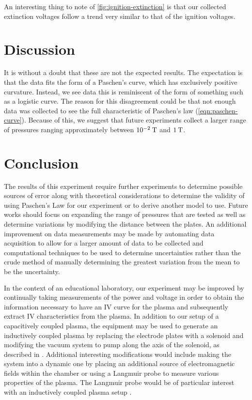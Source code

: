 \documentclass[reprint]{revtex4-1}
\begin{document}
An interesting thing to note of \cref{fig:ignition-extinction} is that our collected extinction voltages follow a trend very similar to that of the ignition voltages.

\section{Discussion}

It is without a doubt that these are not the expected results. The expectation is that the data fits the form of a Paschen's curve, which has exclusively positive curvature. Instead, we see data this is reminiscent of the form of something such as a logistic curve. The reason for this disagreement could be that not enough data was collected to see the full characteristic of Paschen's law (\cref{eqn:paschen-curve}). Because of this, we suggest that future experiments collect a larger range of pressures ranging approximately between $10^{-2}\:\rm{T}$ and $1\:\rm{T}$.


\section{Conclusion}

The results of this experiment require further experiments to determine possible sources of error along with theoretical considerations to determine the validity of using Paschen's Law for our experiment or to derive another model to use. Future works should focus on expanding the range of pressures that are tested as well as determine variations by modifying the distance between the plates. An additional improvement on data measurements may be made by automating data acquisition to allow for a larger amount of data to be collected and computational techniques to be used to determine uncertainties rather than the crude method of manually determining the greatest variation from the mean to be the uncertainty.

In the context of an educational laboratory, our experiment may be improved by continually taking measurements of the power and voltage in order to obtain the information necessary to have an IV curve for the plasma and subsequently extract IV characteristics from the plasma. In addition to our setup of a capacitively coupled plasma,  the equipment may be used to generate an inductively coupled plasma by replacing the electrode plates with a solenoid and modifying the vacuum system to pump along the axis of the solenoid, as described in \cite{physics-radio-frequency,Jiayin2010}. Additional interesting modifications would include making the system into a dynamic one by placing an additional source of electromagnetic fields within the chamber or using a Langmuir probe to measure various properties of the plasma. The Langmuir probe would be of particular interest with an inductively coupled plasma setup \cite{Hopwood1993}.


\end{document}
